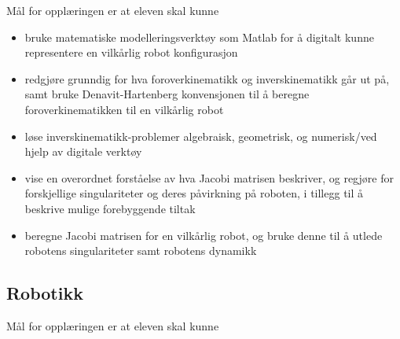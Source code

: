     Mål for opplæringen er at eleven skal kunne

    \begin{itemize}
        \item bruke matematiske modelleringsverktøy som Matlab for å digitalt kunne representere en vilkårlig robot konfigurasjon
        \item redgjøre grunndig for hva foroverkinematikk og inverskinematikk går ut på, samt bruke Denavit-Hartenberg konvensjonen til å beregne foroverkinematikken til en vilkårlig robot
        \item løse inverskinematikk-problemer algebraisk, geometrisk, og numerisk/ved hjelp av digitale verktøy
        \item vise en overordnet forståelse av hva Jacobi matrisen beskriver, og regjøre for forskjellige singulariteter og deres påvirkning på roboten, i tillegg til å beskrive mulige forebyggende tiltak
        \item beregne Jacobi matrisen for en vilkårlig robot, og bruke denne til å utlede robotens singulariteter samt robotens dynamikk
    \end{itemize}


\subsection*{Robotikk}

    Mål for opplæringen er at eleven skal kunne

